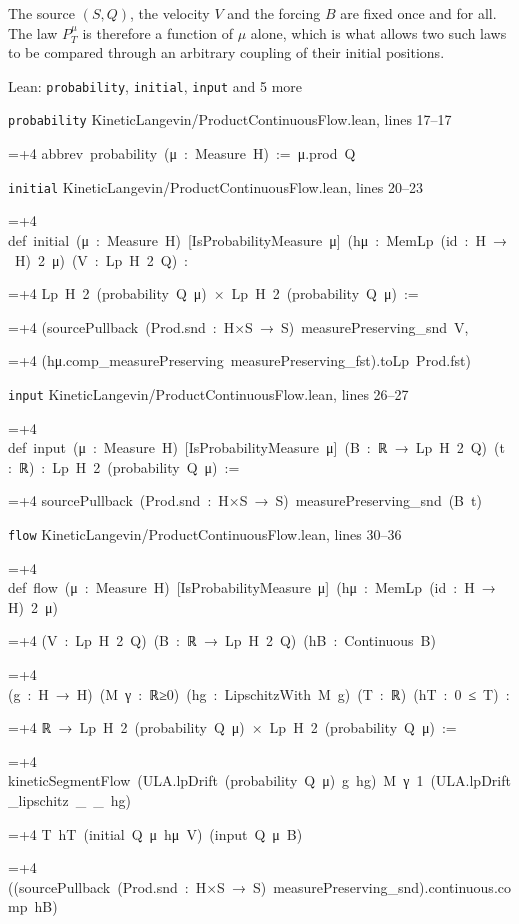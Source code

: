 \documentclass[11pt,a4paper]{article}
\newlength{\leancharwidth}
\newenvironment{leancode}{\par\smallskip\begingroup\ttfamily\footnotesize\raggedright
  \settowidth{\leancharwidth}{M}\setlength{\parskip}{0pt}\setlength{\parindent}{0pt}
  \frenchspacing}{\par\endgroup\smallskip}
\newcommand{\leanline}[2]{\hangindent=\dimexpr#1\leancharwidth+4\leancharwidth\relax
  \hangafter=1\noindent\hspace*{#1\leancharwidth}#2\par}
\newcommand{\leansource}[1]{\par{\footnotesize\color{leanmuted}#1}\par}
\begin{document}
The source \((S,Q)\), the velocity \(V\) and the forcing \(B\) are fixed once and for all. The law \(P^\mu_T\) is therefore a function of \(\mu\) alone, which is what allows two such laws to be compared through an arbitrary coupling of their initial positions.

\begin{leanbox}{Lean: \texttt{probability}, \texttt{initial}, \texttt{input} and 5 more}
\leansource{\texttt{probability} \quad KineticLangevin/\allowbreak{}ProductContinuousFlow.lean, lines 17–17}
\begin{leancode}
\leanline{0}{abbrev\ probability\ (μ\ :\ Measure\ H)\ :=\ μ.prod\ Q}
\end{leancode}
\leansource{\texttt{initial} \quad KineticLangevin/\allowbreak{}ProductContinuousFlow.lean, lines 20–23}
\begin{leancode}
\leanline{0}{def\ initial\ (μ\ :\ Measure\ H)\ [IsProbabilityMeasure\ μ]\ (hμ\ :\ MemLp\ (id\ :\ H\ →\ H)\ 2\ μ)\ (V\ :\ Lp\ H\ 2\ Q)\ :}
\leanline{4}{Lp\ H\ 2\ (probability\ Q\ μ)\ ×\ Lp\ H\ 2\ (probability\ Q\ μ)\ :=}
\leanline{2}{(sourcePullback\ (Prod.snd\ :\ H×S\ →\ S)\ measurePreserving\_snd\ V,}
\leanline{3}{(hμ.comp\_measurePreserving\ measurePreserving\_fst).toLp\ Prod.fst)}
\end{leancode}
\leansource{\texttt{input} \quad KineticLangevin/\allowbreak{}ProductContinuousFlow.lean, lines 26–27}
\begin{leancode}
\leanline{0}{def\ input\ (μ\ :\ Measure\ H)\ [IsProbabilityMeasure\ μ]\ (B\ :\ ℝ\ →\ Lp\ H\ 2\ Q)\ (t\ :\ ℝ)\ :\ Lp\ H\ 2\ (probability\ Q\ μ)\ :=}
\leanline{2}{sourcePullback\ (Prod.snd\ :\ H×S\ →\ S)\ measurePreserving\_snd\ (B\ t)}
\end{leancode}
\leansource{\texttt{flow} \quad KineticLangevin/\allowbreak{}ProductContinuousFlow.lean, lines 30–36}
\begin{leancode}
\leanline{0}{def\ flow\ (μ\ :\ Measure\ H)\ [IsProbabilityMeasure\ μ]\ (hμ\ :\ MemLp\ (id\ :\ H\ →\ H)\ 2\ μ)}
\leanline{4}{(V\ :\ Lp\ H\ 2\ Q)\ (B\ :\ ℝ\ →\ Lp\ H\ 2\ Q)\ (hB\ :\ Continuous\ B)}
\leanline{4}{(g\ :\ H\ →\ H)\ (M\ γ\ :\ ℝ≥0)\ (hg\ :\ LipschitzWith\ M\ g)\ (T\ :\ ℝ)\ (hT\ :\ 0\ ≤\ T)\ :}
\leanline{4}{ℝ\ →\ Lp\ H\ 2\ (probability\ Q\ μ)\ ×\ Lp\ H\ 2\ (probability\ Q\ μ)\ :=}
\leanline{2}{kineticSegmentFlow\ (ULA.lpDrift\ (probability\ Q\ μ)\ g\ hg)\ M\ γ\ 1\ (ULA.lpDrift\_lipschitz\ \_\ \_\ hg)}
\leanline{4}{T\ hT\ (initial\ Q\ μ\ hμ\ V)\ (input\ Q\ μ\ B)}
\leanline{4}{((sourcePullback\ (Prod.snd\ :\ H×S\ →\ S)\ measurePreserving\_snd).continuous.comp\ hB)}

\end{leancode}
\end{leanbox}
\end{document}
